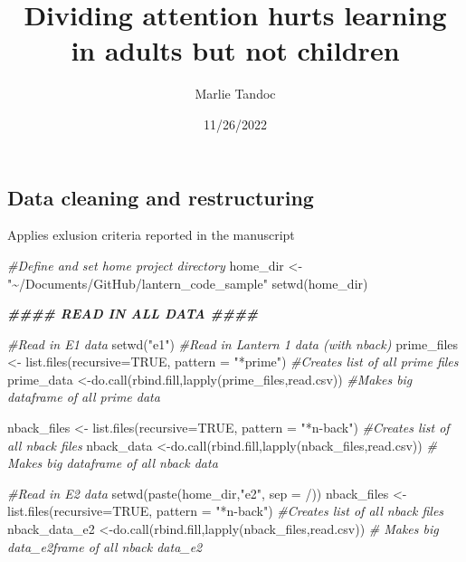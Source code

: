 \documentclass[
]{article}
\title{Dividing attention hurts learning in adults but not children}
\author{Marlie Tandoc}
\date{11/26/2022}
\newenvironment{Shaded}{\begin{snugshade}}{\end{snugshade}}
\newcommand{\AttributeTok}[1]{\textcolor[rgb]{0.77,0.63,0.00}{#1}}
\newcommand{\CommentTok}[1]{\textcolor[rgb]{0.56,0.35,0.01}{\textit{#1}}}
\newcommand{\ConstantTok}[1]{\textcolor[rgb]{0.00,0.00,0.00}{#1}}
\newcommand{\DocumentationTok}[1]{\textcolor[rgb]{0.56,0.35,0.01}{\textbf{\textit{#1}}}}
\newcommand{\FunctionTok}[1]{\textcolor[rgb]{0.00,0.00,0.00}{#1}}
\newcommand{\NormalTok}[1]{#1}
\newcommand{\OtherTok}[1]{\textcolor[rgb]{0.56,0.35,0.01}{#1}}
\newcommand{\StringTok}[1]{\textcolor[rgb]{0.31,0.60,0.02}{#1}}
\begin{document}
\maketitle

\hypertarget{data-cleaning-and-restructuring}{%
\subsection{Data cleaning and
restructuring}\label{data-cleaning-and-restructuring}}

Applies exlusion criteria reported in the manuscript

\begin{Shaded}
\begin{Highlighting}[]
\CommentTok{\#Define and set home project directory }
\NormalTok{home\_dir }\OtherTok{\textless{}{-}} \StringTok{"\textasciitilde{}/Documents/GitHub/lantern\_code\_sample"}
\FunctionTok{setwd}\NormalTok{(home\_dir)}

\DocumentationTok{\#\#\#\# READ IN ALL DATA \#\#\#\#}

\CommentTok{\#Read in E1 data }
\FunctionTok{setwd}\NormalTok{(}\StringTok{"e1"}\NormalTok{)  }\CommentTok{\#Read in Lantern 1 data (with nback)}
\NormalTok{prime\_files }\OtherTok{\textless{}{-}} \FunctionTok{list.files}\NormalTok{(}\AttributeTok{recursive=}\ConstantTok{TRUE}\NormalTok{, }\AttributeTok{pattern =} \StringTok{"*prime"}\NormalTok{) }\CommentTok{\#Creates list of all prime files}
\NormalTok{prime\_data }\OtherTok{\textless{}{-}}\FunctionTok{do.call}\NormalTok{(rbind.fill,}\FunctionTok{lapply}\NormalTok{(prime\_files,read.csv)) }\CommentTok{\#Makes big dataframe of all prime data}

\NormalTok{nback\_files }\OtherTok{\textless{}{-}} \FunctionTok{list.files}\NormalTok{(}\AttributeTok{recursive=}\ConstantTok{TRUE}\NormalTok{, }\AttributeTok{pattern =} \StringTok{"*n{-}back"}\NormalTok{) }\CommentTok{\#Creates list of all nback files}
\NormalTok{nback\_data }\OtherTok{\textless{}{-}}\FunctionTok{do.call}\NormalTok{(rbind.fill,}\FunctionTok{lapply}\NormalTok{(nback\_files,read.csv)) }\CommentTok{\# Makes big dataframe of all nback data}

\CommentTok{\#Read in E2 data}
\FunctionTok{setwd}\NormalTok{(}\FunctionTok{paste}\NormalTok{(home\_dir,}\StringTok{"e2"}\NormalTok{, }\AttributeTok{sep =} \StringTok{\textquotesingle{}/\textquotesingle{}}\NormalTok{))}
\NormalTok{nback\_files }\OtherTok{\textless{}{-}} \FunctionTok{list.files}\NormalTok{(}\AttributeTok{recursive=}\ConstantTok{TRUE}\NormalTok{, }\AttributeTok{pattern =} \StringTok{"*n{-}back"}\NormalTok{) }\CommentTok{\#Creates list of all nback files}
\NormalTok{nback\_data\_e2 }\OtherTok{\textless{}{-}}\FunctionTok{do.call}\NormalTok{(rbind.fill,}\FunctionTok{lapply}\NormalTok{(nback\_files,read.csv)) }\CommentTok{\# Makes big data\_e2frame of all nback data\_e2}


\end{Highlighting}
\end{Shaded}
\end{document}
